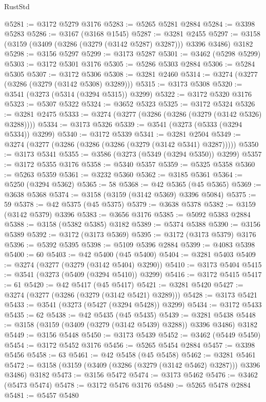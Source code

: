 \begin{lexlean}{RustStd}
\begin{coremodule}
@5281 := @3172 @5279 @3176
@5283 := @5265 @5281 @2884
@5284 := @3398 @5283
@5286 := @3167 (@3168 @1545)
@5287 := @3281 @2455
@5297 := @3158 (@3159 (@3409 (@3286 (@3279 (@3142 @5287) @3287))) @3396 @3486) @3182
@5298 := @3156 @5297
@5299 := @3173 @5287
@5301 := @3462 (@5298 @5299)
@5303 := @3172 @5301 @3176
@5305 := @5286 @5303 @2884
@5306 := @5284 @5305
@5307 := @3172 @5306
@5308 := @3281 @2460
@5314 := @3274 (@3277 (@3286 (@3279 (@3142 @5308) @3289)))
@5315 := @3173 @5308
@5320 := @3541 (@3273 (@5314 (@3294 @5315)) @3299)
@5322 := @3172 @5320 @3176
@5323 := @5307 @5322
@5324 := @3652 @5323
@5325 := @3172 @5324
@5326 := @3281 @2475
@5333 := @3274 (@3277 (@3286 (@3286 (@3279 (@3142 @5326) @3288))))
@5334 := @3173 @5326
@5339 := @3541 (@3273 (@5333 (@3294 @5334)) @3299)
@5340 := @3172 @5339
@5341 := @3281 @2504
@5349 := @3274 (@3277 (@3286 (@3286 (@3286 (@3279 (@3142 @5341) @3287)))))
@5350 := @3173 @5341
@5355 := @3586 (@3273 (@5349 (@3294 @5350)) @3299)
@5357 := @3172 @5355 @3176
@5358 := @5340 @5357
@5359 := @5325 @5358
@5360 := @5263 @5359
@5361 := @3232 @5360
@5362 := @3185 @5361
@5364 := @5250 (@3294 @5362)
@5365 := 58
@5368 := @42 @5365 (@45 @5365)
@5369 := @3638 @5368
@5374 := @3158 (@3159 (@3142 @5369) @3396 @5084)
@5375 := 59
@5378 := @42 @5375 (@45 @5375)
@5379 := @3638 @5378
@5382 := @3159 (@3142 @5379) @3396
@5383 := @3656 @3176
@5385 := @5092 @5383 @2884
@5388 := @3158 (@5382 @5385) @3182
@5389 := @5374 @5388
@5390 := @3156 @5389
@5392 := @3172 (@3173 @5369)
@5395 := @3172 (@3173 @5379) @3176
@5396 := @5392 @5395
@5398 := @5109 @5396 @2884
@5399 := @4083 @5398
@5400 := 60
@5403 := @42 @5400 (@45 @5400)
@5404 := @3281 @5403
@5409 := @3274 (@3277 (@3279 (@3142 @5404) @3290))
@5410 := @3173 @5404
@5415 := @3541 (@3273 (@5409 (@3294 @5410)) @3299)
@5416 := @3172 @5415
@5417 := 61
@5420 := @42 @5417 (@45 @5417)
@5421 := @3281 @5420
@5427 := @3274 (@3277 (@3286 (@3279 (@3142 @5421) @3289)))
@5428 := @3173 @5421
@5433 := @3541 (@3273 (@5427 (@3294 @5428)) @3299)
@5434 := @3172 @5433
@5435 := 62
@5438 := @42 @5435 (@45 @5435)
@5439 := @3281 @5438
@5448 := @3158 (@3159 (@3409 (@3279 (@3142 @5439) @3288)) @3396 @3486) @3182
@5449 := @3156 @5448
@5450 := @3173 @5439
@5452 := @3462 (@5449 @5450)
@5454 := @3172 @5452 @3176
@5456 := @5265 @5454 @2884
@5457 := @3398 @5456
@5458 := 63
@5461 := @42 @5458 (@45 @5458)
@5462 := @3281 @5461
@5472 := @3158 (@3159 (@3409 (@3286 (@3279 (@3142 @5462) @3287))) @3396 @3486) @3182
@5473 := @3156 @5472
@5474 := @3173 @5462
@5476 := @3462 (@5473 @5474)
@5478 := @3172 @5476 @3176
@5480 := @5265 @5478 @2884
@5481 := @5457 @5480

\end{coremodule}
\end{lexlean}
